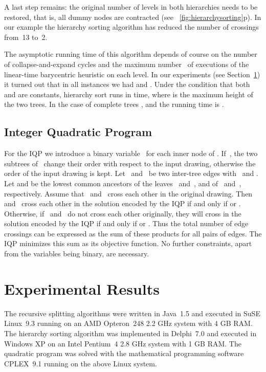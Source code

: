 \documentclass[runningheads,a4paper]{llncs}
\begin{document}
A last step remains: the original number of levels in both
hierarchies needs to be restored, that is, all dummy
nodes are contracted (see \figurename~\ref{fig:hierarchysorting}p).
In our example the hierarchy sorting algorithm has reduced the
number of crossings from~13 to~2.

The asymptotic running time of this algorithm depends of course on the
number~ of collapse-and-expand cycles and the maximum number~
of executions of the linear-time barycentric heuristic on each level.
In our experiments (see Section~\ref{sec:experimental-results}) it
turned out that in all instances we had  and .
Under the condition that both  and  are constants, hierarchy
sort runs in  time, where  is the maximum height of
the two trees. In the case of complete trees , and the
running time is .

\subsection{Integer Quadratic Program}\label{sec:int-quad-prog}

For the IQP we introduce a binary variable~ for each inner node
of .  If~, the two subtrees of~ change their
order with respect to the input drawing, otherwise the order of the
input drawing is kept.  Let~ and~ be two inter-tree edges
with~ and .  Let  and  be
the lowest common ancestors of the leaves~ and~, and of~
and~, respectively.  Assume that~ and~ cross each other
in the original drawing.  Then~ and~ cross each other in the
solution encoded by the IQP if and only if  or
.  Otherwise, if~ and~ do not
cross each other originally, they will cross in the solution encoded
by the IQP if and only if  or . Thus the total number of edge crossings can be expressed
as the sum of these products for all pairs of edges.  The IQP
minimizes this sum as its objective function. No further
constraints, apart from the variables being binary, are necessary.

\section{Experimental Results}\label{sec:experimental-results}

The recursive splitting algorithms were written in Java~1.5 and
executed in SuSE Linux~9.3 running on an AMD Opteron~248 2.2 GHz
system with 4 GB RAM.  The hierarchy sorting algorithm was implemented
in Delphi~7.0 and executed in Windows XP on an Intel Pentium~4 2.8 GHz
system with 1 GB RAM.  The quadratic program was solved with the
mathematical programming software CPLEX~9.1 running on the above Linux
system.
\end{document}
